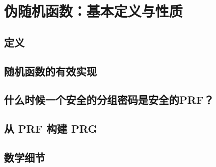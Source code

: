 \section{伪随机函数：基本定义与性质}

\subsection{定义}

\subsection{随机函数的有效实现}

\subsection{什么时候一个安全的分组密码是安全的PRF？}

\subsection{从 PRF 构建 PRG}\label{subsec:4-4-4}

\subsection{数学细节}